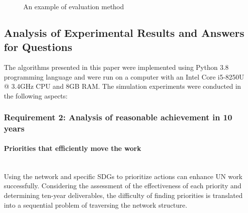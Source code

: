 \documentclass[10pt]{mcmthesis}
\newcommand{\subsubsubsection}[1]{\paragraph{#1}\mbox{}\\}
\begin{document}
 \begin{figure}[H]
    \centering
    
    \caption{ An example of evaluation method  }%
    \label{fig.example}
\end{figure}



\subsection{Analysis of Experimental Results and Answers for Questions}%

The algorithms presented in this paper were implemented using Python 3.8 programming language and were run on a computer with an Intel Core i5-8250U @ 3.4GHz CPU and 8GB RAM. The simulation experiments were conducted in the following aspects:

\subsubsection{ Requirement 2: Analysis of reasonable achievement in 10 years}
\subsubsubsection{ Priorities that  efficiently move the work }


Using the network and specific SDGs to prioritize actions can enhance UN work successfully. Considering the assessment of the effectiveness of each priority and determining ten-year deliverables, the difficulty of finding priorities is translated into a sequential problem of traversing the
network structure.
\end{document}
